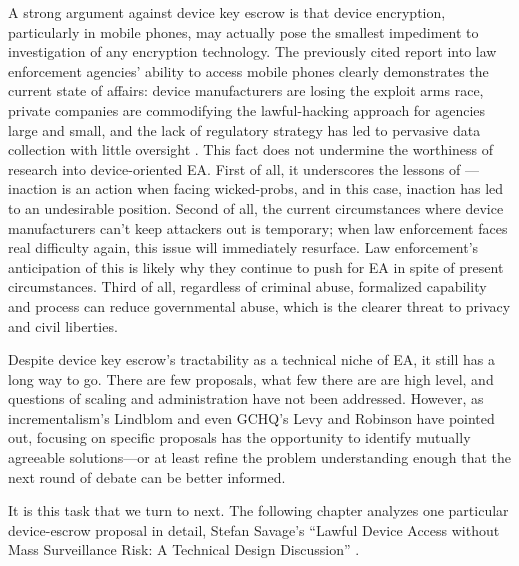 A strong argument against device key escrow is that device encryption, particularly in mobile phones, may actually pose
the smallest impediment to investigation of any encryption technology. The previously cited report into law enforcement
agencies' ability to access mobile phones clearly demonstrates the current state of affairs: device manufacturers are
losing the exploit arms race, private companies are commodifying the \ac{lawful-hacking} approach for agencies large and
small, and the lack of regulatory strategy has led to pervasive data collection with little oversight
\cite{koepke_2020}. This fact does not undermine the worthiness of research into device-oriented \ac{EA}. First of all,
it underscores the lessons of ---inaction is an action when facing \acp{wicked-prob}, and in this
case, inaction has led to an undesirable position. Second of all, the current circumstances where device manufacturers
can't keep attackers out is temporary; when law enforcement faces real difficulty again, this issue will immediately
resurface. Law enforcement's anticipation of this is likely why they continue to push for \ac{EA} in spite of present
circumstances. Third of all, regardless of criminal abuse, formalized capability and process can reduce governmental
abuse, which is the clearer threat to privacy and civil liberties.

Despite device key escrow's tractability as a technical niche of \ac{EA}, it still has a long way to go. There are few
proposals, what few there are are high level, and questions of scaling and administration have not been addressed.
However, as \ac{incrementalism}'s Lindblom and even \ac{GCHQ}'s Levy and Robinson have pointed out, focusing on specific
proposals has the opportunity to identify mutually agreeable solutions---or at least refine the problem understanding
enough that the next round of debate can be better informed.

It is this task that we turn to next. The following chapter analyzes one particular device-escrow proposal in detail,
Stefan Savage's ``Lawful Device Access without Mass Surveillance Risk: A Technical Design Discussion''
\cite{savage_lawful_2018}.
